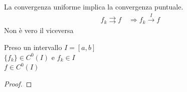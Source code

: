 \documentclass[a4paper, oneside]{article}
\begin{document}
\begin{observation}
  La convergenza uniforme implica la convergenza puntuale.\\
  \begin{gather*}
    f_k \rightrightarrows  f \quad \Rightarrow f_k \overset{I}{\to} f
  \end{gather*}
  Non è vero il viceversa
\end{observation}


\begin{theorem}
  Preso un intervallo $I = [a,b]$\\
   $\{f_k\} \in C^0 (I)$ e $f_k \in I$\\
   $f \in C^0 (I)$
\end{theorem}

\begin{proof}

\end{proof}
\end{document}
